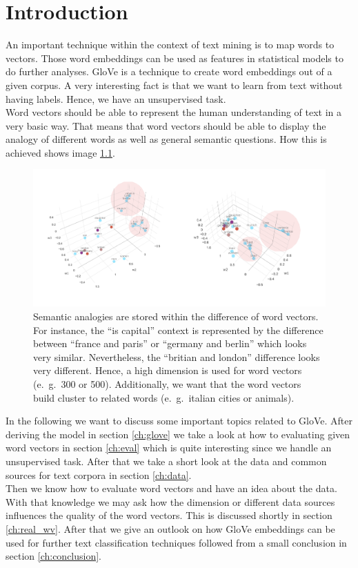 \chapter{Introduction}

An important technique within the context of text mining is to map words to vectors. Those 
word embeddings can be used as features in statistical models to do further analyses. 
GloVe is a technique to create word embeddings out of a given corpus. A very interesting 
fact is that we want to learn from text without having labels. Hence, we have an unsupervised 
task. \\

Word vectors should be able to represent the human understanding of text in a very 
basic way. That means that word vectors should be able to display the analogy of different 
words as well as general semantic questions. How this is achieved shows image \ref{fig:wv}. 

\begin{figure}[!h]
\centering
\includegraphics[scale=0.7]{images/wv_glove.png} 
\caption[Word vectors in 3 dimensions trained by GloVe.]{Semantic analogies are stored within 
         the difference of word vectors. For instance, the \enquote{is capital} context is
         represented by the difference between \enquote{france and paris} or 
         \enquote{germany and berlin} which looks very similar. Nevertheless, 
         the \enquote{britian and london} difference looks very different. Hence, a high
         dimension is used for word vectors (e.~g.~300 or 500). Additionally, we want that 
         the word vectors build cluster to related words (e.~g.~italian cities or animals).}
\label{fig:wv}
\end{figure}

In the following we want to discuss some important topics related to GloVe. After 
deriving the model in section \ref{ch:glove} we take a look at how 
to evaluating given word vectors in section \ref{ch:eval} which is quite interesting 
since we handle an unsupervised task. After that we take a short look at the data 
and common sources for text corpora in section \ref{ch:data}. \\

Then we know how to evaluate word vectors and have an idea about the data. With that 
knowledge we may ask how the dimension or different data 
sources influences the quality of the word vectors. This is discussed shortly in section
\ref{ch:real_wv}. After that we give an outlook on how GloVe embeddings can be used for
further text classification techniques followed from a small conclusion in section
\ref{ch:conclusion}.
